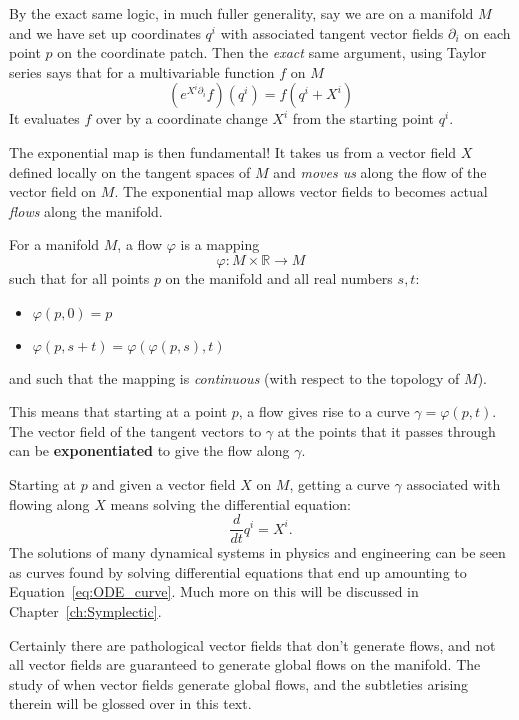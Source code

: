 		By the exact same logic, in much fuller generality, say we are on a manifold $M$ and we have set up coordinates $q^i$ with associated tangent vector fields $\partial_i$ on each point $p$ on the coordinate patch. Then the \emph{exact} same argument, using Taylor series says that for a multivariable function $f$ on $M$
		\begin{equation}
			(e^{X^i \partial_i} f)(q^i) = f(q^i + X^i)
		\end{equation}
		It evaluates $f$ over by a coordinate change $X^i$ from the starting point $q^i$.
		
		The exponential map is then fundamental! It takes us from a vector field $X$ defined locally on the tangent spaces of $M$ and \emph{moves us} along the flow of the vector field on $M$. The exponential map allows vector fields to becomes actual \emph{flows} along the manifold. 
		\begin{defn}
			For a manifold $M$, a flow $\varphi$ is a mapping
			\begin{equation}
				\varphi: M \times \mathbb R \rightarrow M
			\end{equation}
			such that for all points $p$ on the manifold and all real numbers $s,t$:
			\begin{itemize}
				\item $\varphi(p,0) = p$
				\item $\varphi(p,s+t) = \varphi(\varphi(p,s),t)$
			\end{itemize}
			and such that the mapping is \emph{continuous} (with respect to the topology of $M$).
		\end{defn}
		This means that starting at a point $p$, a flow gives rise to a curve $\gamma = \varphi(p,t)$. The vector field of the tangent vectors to $\gamma$ at the points that it passes through can be \textbf{exponentiated} to give the flow along $\gamma$.
		
		Starting at $p$ and given a vector field $X$ on $M$, getting a curve $\gamma$ associated with flowing along $X$ means solving the differential equation:
		\begin{equation}\label{eq:ODE_curve}
			\frac{d}{dt} q^i = X^i.
		\end{equation}
		The solutions of many dynamical systems in physics and engineering can be seen as curves found by solving differential equations that end up amounting to  Equation~\eqref{eq:ODE_curve}. Much more on this will be discussed in Chapter~\ref{ch:Symplectic}. 
		
		\begin{nb}
			Certainly there are pathological vector fields that don't generate flows, and not all vector fields are guaranteed to generate global flows on the manifold. The study of when vector fields generate global flows, and the subtleties arising therein will be glossed over in this text.
		\end{nb}
		
